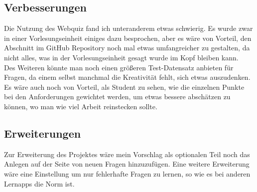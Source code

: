 \documentclass[a4paper,12pt,titlepage]{scrartcl}
\begin{document}
        \subsection{Verbesserungen}
            Die Nutzung des Webquiz fand ich unteranderem etwas schwierig. Es wurde zwar in einer Vorlesungseinheit einiges dazu besprochen, aber es wäre von Vorteil, den Abschnitt im GitHub Repository noch mal etwas umfangreicher zu gestalten, da nicht alles, was in der Vorlesungseinheit gesagt wurde im Kopf bleiben kann.\\
            Des Weiteren könnte man noch einen größeren Test-Datensatz anbieten für Fragen, da einem selbst manchmal die Kreativität fehlt, sich etwas auszudenken.\\
            Es wäre auch noch von Vorteil, als Student zu sehen, wie die einzelnen Punkte bei den Anforderungen gewichtet werden, um etwas bessere abschätzen zu können, wo man wie viel Arbeit reinstecken sollte.
        \subsection{Erweiterungen}
            Zur Erweiterung des Projektes wäre mein Vorschlag als optionalen Teil noch das Anlegen auf der Seite von neuen Fragen hinzuzufügen.
            Eine weitere Erweiterung wäre eine Einstellung um nur fehlerhafte Fragen zu lernen, so wie es bei anderen Lernapps die Norm ist.
    \newpage
\end{document}
